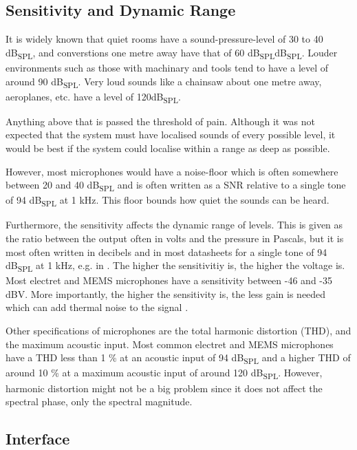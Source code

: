 \documentclass[notitlepage]{report}
\begin{document}
\subsection{Sensitivity and Dynamic Range}

It is widely known that quiet rooms have a sound-pressure-level of 30 to 40 \si{dB_{SPL}}\cite{noauthor_comprehensive_nodate}, and converstions one metre away have that of 60 \si{dB_{SPL}}\si{dB_{SPL}}\cite{noauthor_decibel_nodate}. Louder environments such as those with machinary and tools tend to have a level of around 90 \si{dB_{SPL}}\cite{abbott_decibels_nodate}. Very loud sounds like a chainsaw about one metre away, aeroplanes, etc. have a level of 120\si{dB_{SPL}}\cite{noauthor_decibel_nodate}. 

Anything above that is passed the threshold of pain\cite{noauthor_decibel_nodate}. Although it was not expected that the system must have localised sounds of every possible level, it would be best if the system could localise within a range as deep as possible.

However, most microphones would have a noise-floor which is often somewhere between 20 and 40 \si{dB_{SPL}} and is often written as a SNR relative to a single tone of 94 \si{dB_{SPL}} at 1 \si{kHz}\cite{sennequier_pre-amplifying_2015}. This floor bounds how quiet the sounds can be heard.

Furthermore, the sensitivity affects the dynamic range of levels. This is given as the ratio between the output often in volts and the pressure in Pascals\cite{lewis_understanding_nodate}, but it is most often written in decibels and in most datasheets for a single tone of 94 \si{dB_{SPL}} at 1 \si{kHz}, e.g. in \cite{noauthor_spw2430hr5h-b_2014}. The higher the sensitivitiy is, the higher the voltage is. Most electret and MEMS microphones have a sensitivity between -46 and -35 \si{dBV}. More importantly, the higher the sensitivity is, the less gain is needed which can add thermal noise to the signal \cite{simmons_microphones_2021}.

Other specifications of microphones are the total harmonic distortion (THD), and the maximum acoustic input. Most common electret and MEMS microphones have a THD less than 1 \% at an acoustic input of 94 \si{dB_{SPL}} and a higher THD of around 10 \% at a maximum acoustic input of around 120 \si{dB_{SPL}}. However, harmonic distortion might not be a big problem since it does not affect the spectral phase, only the spectral magnitude.

\subsection{Interface}
\end{document}
